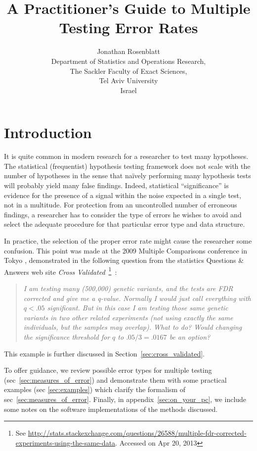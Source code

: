 \documentclass[review,12pt]{article}
\title{A Practitioner's Guide to Multiple Testing Error Rates}
\author{Jonathan Rosenblatt \\
	Department of Statistics and Operations Research,\\
	The Sackler Faculty of Exact Sciences, \\
	Tel Aviv University \\ 
	Israel}
\theoremstyle{definition}
\begin{document}
\maketitle


\section{\label{sec:introduction}Introduction}

It is quite common in modern research for a researcher to test many hypotheses. 
The statistical (frequentist) hypothesis testing framework does not scale with the number of hypotheses in the sense that na\"{i}vely performing many hypothesis tests will probably yield many false findings. 
Indeed, statistical ``significance'' is evidence for the presence of a signal within the noise expected in a single test, not in a multitude. 
For protection from an uncontrolled number of erroneous findings, a researcher has to consider the type of errors he wishes to avoid and select the adequate procedure for that particular error type and data structure. 

In practice, the selection of the proper error rate might cause the researcher some confusion. This point was made at the 2009 Multiple Comparisons conference in Tokyo \citep[][Section 4.4]{benjamini_simultaneous_2010}, demonstrated in the following question from the statistics Questions \& Answers web site \emph{Cross Validated}~\footnote{ See \url{http://stats.stackexchange.com/questions/26588/multiple-fdr-corrected-experiments-using-the-same-data}. Accessed on Apr 20, 2013}~:
\begin{quotation}\em
I am testing many (500,000) genetic variants, and the tests are FDR corrected and give me a q-value. Normally I would just call everything with $q < .05$ significant. But in this case I am testing those same genetic variants in two other related experiments (not using exactly the same individuals, but the samples may overlap). What to do? Would changing the significance threshold for $q$ to $.05/3=.0167$ be an option?
\end{quotation}
This example is  further discussed in Section~\ref{sec:cross_validated}. 

To offer guidance, we review possible error types for multiple testing (sec~\ref{sec:measures_of_error}) and demonstrate them with some practical examples (sec \ref{sec:examples}) which clarify the formalism of sec~\ref{sec:measures_of_error}. Finally, in appendix~\ref{sec:on_your_pc}, we include some notes on the software implementations of the methods discussed.
\end{document}
